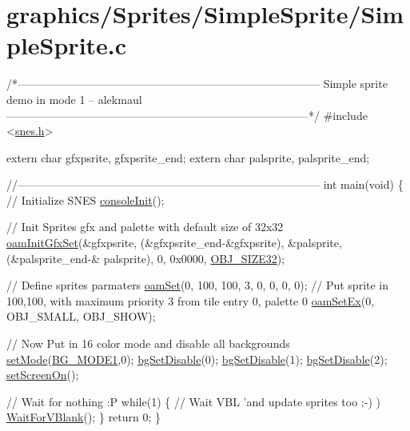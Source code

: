 \hypertarget{a00410}{}\section{graphics/\+Sprites/\+Simple\+Sprite/\+Simple\+Sprite.\+c}

\begin{DoxyCodeInclude}
\textcolor{comment}{/*---------------------------------------------------------------------------------}
\textcolor{comment}{}
\textcolor{comment}{}
\textcolor{comment}{    Simple sprite demo in mode 1}
\textcolor{comment}{    -- alekmaul}
\textcolor{comment}{}
\textcolor{comment}{}
\textcolor{comment}{---------------------------------------------------------------------------------*/}
\textcolor{preprocessor}{#include <\hyperlink{a00356}{snes.h}>}

\textcolor{keyword}{extern} \textcolor{keywordtype}{char} gfxpsrite, gfxpsrite\_end;
\textcolor{keyword}{extern} \textcolor{keywordtype}{char} palsprite, palsprite\_end;

\textcolor{comment}{//---------------------------------------------------------------------------------}
\textcolor{keywordtype}{int} main(\textcolor{keywordtype}{void}) \{
    \textcolor{comment}{// Initialize SNES }
    \hyperlink{a00320_a6047713bb5a73afd3cd1d77e336bcdad}{consoleInit}();
    
    \textcolor{comment}{// Init Sprites gfx and palette with default size of 32x32}
    \hyperlink{a00350_a46e0be47f8fc865a7f43c1b0b126e59a}{oamInitGfxSet}(&gfxpsrite, (&gfxpsrite\_end-&gfxpsrite), &palsprite, (&palsprite\_end-&
      palsprite), 0, 0x0000, \hyperlink{a00350_abc6679a83d9647eac01c3d51ef37151a}{OBJ\_SIZE32});

    \textcolor{comment}{// Define sprites parmaters}
    \hyperlink{a00350_a2f62a591672b786d90ebb03fdf25f159}{oamSet}(0,  100, 100, 3, 0, 0, 0, 0); \textcolor{comment}{// Put sprite in 100,100, with maximum priority 3 from tile
       entry 0, palette 0}
    \hyperlink{a00350_a4120a8ff32c39973babeca3615a0a2fd}{oamSetEx}(0, OBJ\_SMALL, OBJ\_SHOW);
    
    \textcolor{comment}{// Now Put in 16 color mode and disable all backgrounds}
    \hyperlink{a00353_afd9e46ae627d055dd8c98a4b0ebb73b1}{setMode}(\hyperlink{a00317_a05c862edb7f8f75036f10c04dcc3c2a6}{BG\_MODE1},0); \hyperlink{a00317_a4dbfb1b8854ff9ca4a7d11a899281bbb}{bgSetDisable}(0); 
      \hyperlink{a00317_a4dbfb1b8854ff9ca4a7d11a899281bbb}{bgSetDisable}(1); \hyperlink{a00317_a4dbfb1b8854ff9ca4a7d11a899281bbb}{bgSetDisable}(2);
    \hyperlink{a00353_abc7d4ef8ebc22f5b710927909bb3f144}{setScreenOn}();
    
    \textcolor{comment}{// Wait for nothing :P}
    \textcolor{keywordflow}{while}(1) \{
        \textcolor{comment}{// Wait VBL 'and update sprites too ;-) )}
        \hyperlink{a00326_a815e2626bd26d0e936d507a363ecd723}{WaitForVBlank}();
    \}
    \textcolor{keywordflow}{return} 0;
\}
\end{DoxyCodeInclude}
 